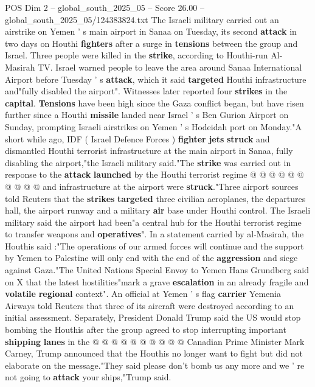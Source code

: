 \begin{textsample}{POS Dim 2 – global\_south\_2025\_05 – Score 26.00 – global\_south\_2025\_05/124383824.txt}  \label{ex:f2_pos_291}
The Israeli military carried out an airstrike on Yemen ' s main airport in Sanaa on Tuesday, its second \textbf{attack} in two days on Houthi \textbf{fighters} after a surge in \textbf{tensions} between the group and Israel.
Three people were killed in the \textbf{strike}, according to Houthi-run Al-Masirah TV.
Israel warned people to leave the area around Sanaa International Airport before Tuesday ' s \textbf{attack}, which it said \textbf{targeted} Houthi infrastructure and"fully disabled the airport".
Witnesses later reported four \textbf{strikes} in the \textbf{capital}. \textbf{Tensions} have been high since the Gaza conflict began, but have risen further since a Houthi \textbf{missile} landed near Israel ' s Ben Gurion Airport on Sunday, prompting Israeli airstrikes on Yemen ' s Hodeidah port on Monday."A short while ago, IDF ( Israel Defence Forces ) \textbf{fighter} \textbf{jets} \textbf{struck} and dismantled Houthi terrorist infrastructure at the main airport in Sanaa, fully disabling the airport,"the Israeli military said."The \textbf{strike} was carried out in response to the \textbf{attack} \textbf{launched} by the Houthi terrorist regime @ @ @ @ @ @ @ @ @ @ and infrastructure at the airport were \textbf{struck}."Three airport sources told Reuters that the \textbf{strikes} \textbf{targeted} three civilian aeroplanes, the departures hall, the airport runway and a military \textbf{air} base under Houthi control.
The Israeli military said the airport had been"a central hub for the Houthi terrorist regime to transfer weapons and \textbf{operatives}".
In a statement carried by al-Masirah, the Houthis said :"The operations of our armed forces will continue and the support by Yemen to Palestine will only end with the end of the \textbf{aggression} and siege against Gaza."The United Nations Special Envoy to Yemen Hans Grundberg said on X that the latest hostilities"mark a grave \textbf{escalation} in an already fragile and \textbf{volatile} \textbf{regional} context".
An official at Yemen ' s flag \textbf{carrier} Yemenia Airways told Reuters that three of its aircraft were destroyed according to an initial assessment.
Separately, President Donald Trump said the US would stop bombing the Houthis after the group agreed to stop interrupting important \textbf{shipping} \textbf{lanes} in the @ @ @ @ @ @ @ @ @ @ Canadian Prime Minister Mark Carney, Trump announced that the Houthis no longer want to fight but did not elaborate on the message."They said please don't bomb us any more and we ' re not going to \textbf{attack} your ships,"Trump said.

\end{textsample}
